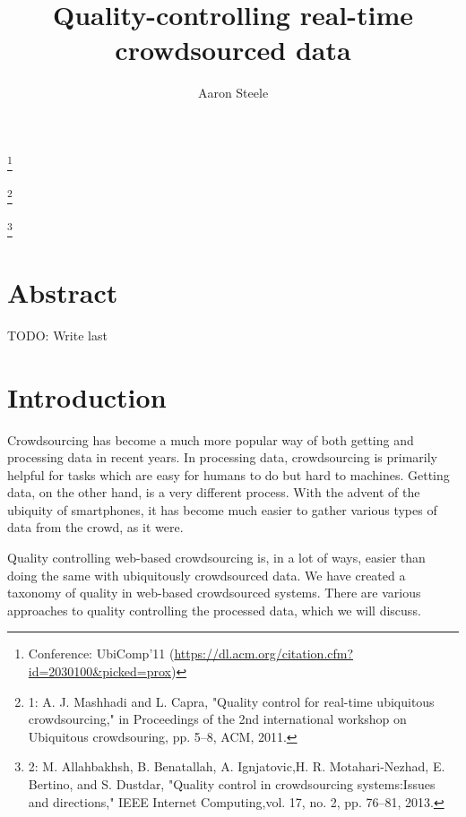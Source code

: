 \documentclass[9pt,twocolumn]{article}
\title{Quality-controlling real-time crowdsourced data}
\author{Aaron Steele}
\date{}
\newcommand\blfootnote[1]{%
	\begingroup
	\renewcommand\thefootnote{}\footnote{#1}%
	\addtocounter{footnote}{-1}%
	\endgroup
}
\begin{document}
	\maketitle
	
	\blfootnote{Conference: UbiComp'11 (\url{https://dl.acm.org/citation.cfm?id=2030100&picked=prox}) }
	\blfootnote{1: A. J. Mashhadi and L. Capra, "Quality control for real-time ubiquitous crowdsourcing," in Proceedings of the 2nd international workshop on Ubiquitous crowdsouring, pp. 5–8, ACM, 2011.}
	\blfootnote{2: M. Allahbakhsh, B. Benatallah, A. Ignjatovic,H. R. Motahari-Nezhad, E. Bertino, and S. Dustdar, "Quality control in crowdsourcing systems:Issues and directions," IEEE Internet Computing,vol. 17, no. 2, pp. 76–81, 2013.}
	
	
	
	\section*{Abstract}
	TODO: Write last
	\cite{UB-QC-CC}
	\section*{Introduction}
	Crowdsourcing has become a much more popular way of both getting and processing data in recent years. In processing data, crowdsourcing is primarily helpful for tasks which are easy for humans to do but hard to machines. %
	Getting data, on the other hand, is a very different process. With the advent of the ubiquity of smartphones, it has become much easier to gather various types of data from the crowd, as it were.
	
	Quality controlling web-based crowdsourcing is, in a lot of ways, easier than doing the same with ubiquitously crowdsourced data. We have created a taxonomy of quality in web-based crowdsourced systems. There are various approaches to quality controlling the processed data, which we will discuss.
	
\end{document}
